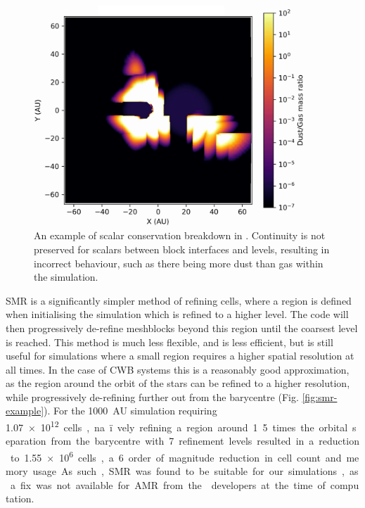 \begin{figure}[ht]
  \centering
  \includegraphics[width=4in]{assets/refinement/breakdown.png}
  \caption[AMR breakdown in \athena]{An example of scalar conservation breakdown in \athena. Continuity is not preserved for scalars between block interfaces and levels, resulting in incorrect behaviour, such as there being more dust than gas within the simulation.}
  \label{fig:amrbreakdown}
\end{figure}

SMR is a significantly simpler method of refining cells, where a region is defined when initialising the simulation which is refined to a higher level.
The code will then progressively de-refine meshblocks beyond this region until the coarsest level is reached.
This method is much less flexible, and is less efficient, but is still useful for simulations where a small region requires a higher spatial resolution at all times. 
In the case of CWB systems this is a reasonably good approximation, as the region around the orbit of the stars can be refined to a higher resolution, while progressively de-refining further out from the barycentre (Fig. \ref{fig:smr-example}).
For the \SI{1000}{AU} simulation requiring \SI{1.07e12} cells, na\"ively refining a region around 1.5 times the orbital separation from the barycentre with 7 refinement levels resulted in a reduction to \num{1.55e6} cells, a 6 order of magnitude reduction in cell count and memory usage.
As such, SMR was found to be suitable for our simulations, as a fix was not available for AMR from the \athena{} developers at the time of computation.

